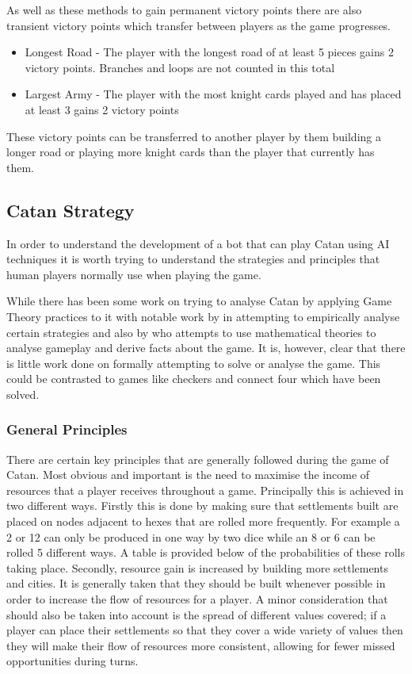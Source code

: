 \documentclass[]{article}
\begin{document}
\par As well as these methods to gain permanent victory points there are also transient victory points which transfer between players as the game progresses.

\begin{itemize}
	\item Longest Road - The player with the longest road of at least 5 pieces gains 2 victory points. Branches and loops are not counted in this total
	\item Largest Army - The player with the most knight cards played and has placed at least 3 gains 2 victory points
\end{itemize}
 
 \par These victory points can be transferred to another player by them building a longer road or playing more knight cards than the player that currently has them.


\subsection{Catan Strategy}
In order to understand the development of a bot that can play Catan using AI techniques it is worth trying to understand the strategies and principles that human players normally use when playing the game. 

\par While there has been some work on trying to analyse Catan by applying Game Theory practices to it with notable work  by \textcite{guhe2014game} in attempting to empirically analyse certain strategies and also by \textcite{keep2010} who attempts to use mathematical theories to analyse gameplay and derive facts about the game. It is, however, clear that there is little work done on formally attempting to solve or analyse the game. This could be contrasted to games like checkers and connect four which have been solved.

\subsubsection{General Principles}
There are certain key principles that are generally followed during the game of Catan. Most obvious and important is the need to maximise the income of resources that a player receives throughout a game. Principally this is achieved in two different ways. Firstly this is done by making sure that settlements built are placed on nodes adjacent to hexes that are rolled more frequently. For example a 2 or 12 can only be produced in one way by two dice while an 8 or 6 can be rolled 5 different ways. A table is provided below of the probabilities of these rolls taking place. Secondly, resource gain is increased by building more settlements and cities. It is generally taken that they should be built whenever possible in order to increase the flow of resources for a player. A minor consideration that should also be taken into account is the spread of different values covered; if a player can place their settlements so that they cover a wide variety of values then they will make their flow of resources more consistent, allowing for fewer missed opportunities during turns.
\end{document}
